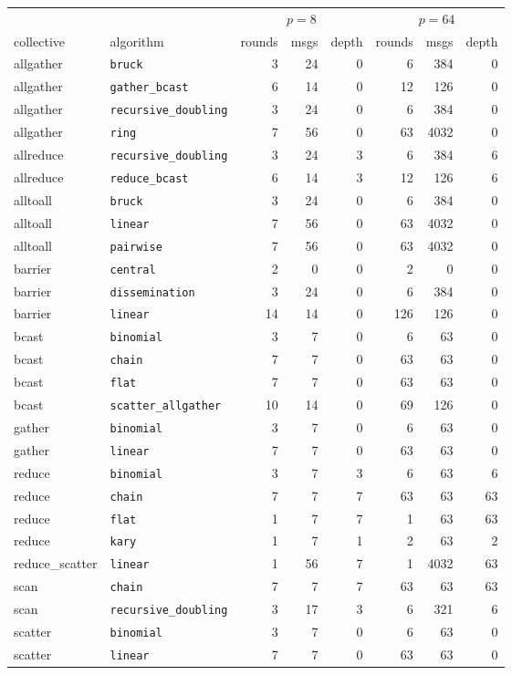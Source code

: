 \begin{tabular}{llrrrrrr}
\toprule
& & \multicolumn{3}{c}{$p=8$} & \multicolumn{3}{c}{$p=64$} \\
\cmidrule(lr){3-5}\cmidrule(lr){6-8}
collective & algorithm & rounds & msgs & depth & rounds & msgs & depth \\
\midrule
allgather & \texttt{bruck} & 3 & 24 & 0 & 6 & 384 & 0 \\
allgather & \texttt{gather\_bcast} & 6 & 14 & 0 & 12 & 126 & 0 \\
allgather & \texttt{recursive\_doubling} & 3 & 24 & 0 & 6 & 384 & 0 \\
allgather & \texttt{ring} & 7 & 56 & 0 & 63 & 4032 & 0 \\
allreduce & \texttt{recursive\_doubling} & 3 & 24 & 3 & 6 & 384 & 6 \\
allreduce & \texttt{reduce\_bcast} & 6 & 14 & 3 & 12 & 126 & 6 \\
alltoall & \texttt{bruck} & 3 & 24 & 0 & 6 & 384 & 0 \\
alltoall & \texttt{linear} & 7 & 56 & 0 & 63 & 4032 & 0 \\
alltoall & \texttt{pairwise} & 7 & 56 & 0 & 63 & 4032 & 0 \\
barrier & \texttt{central} & 2 & 0 & 0 & 2 & 0 & 0 \\
barrier & \texttt{dissemination} & 3 & 24 & 0 & 6 & 384 & 0 \\
barrier & \texttt{linear} & 14 & 14 & 0 & 126 & 126 & 0 \\
bcast & \texttt{binomial} & 3 & 7 & 0 & 6 & 63 & 0 \\
bcast & \texttt{chain} & 7 & 7 & 0 & 63 & 63 & 0 \\
bcast & \texttt{flat} & 7 & 7 & 0 & 63 & 63 & 0 \\
bcast & \texttt{scatter\_allgather} & 10 & 14 & 0 & 69 & 126 & 0 \\
gather & \texttt{binomial} & 3 & 7 & 0 & 6 & 63 & 0 \\
gather & \texttt{linear} & 7 & 7 & 0 & 63 & 63 & 0 \\
reduce & \texttt{binomial} & 3 & 7 & 3 & 6 & 63 & 6 \\
reduce & \texttt{chain} & 7 & 7 & 7 & 63 & 63 & 63 \\
reduce & \texttt{flat} & 1 & 7 & 7 & 1 & 63 & 63 \\
reduce & \texttt{kary} & 1 & 7 & 1 & 2 & 63 & 2 \\
reduce\_scatter & \texttt{linear} & 1 & 56 & 7 & 1 & 4032 & 63 \\
scan & \texttt{chain} & 7 & 7 & 7 & 63 & 63 & 63 \\
scan & \texttt{recursive\_doubling} & 3 & 17 & 3 & 6 & 321 & 6 \\
scatter & \texttt{binomial} & 3 & 7 & 0 & 6 & 63 & 0 \\
scatter & \texttt{linear} & 7 & 7 & 0 & 63 & 63 & 0 \\
\bottomrule
\end{tabular}
